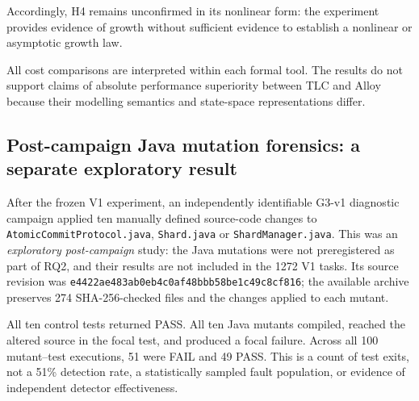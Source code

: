 Accordingly, H4 remains unconfirmed in its nonlinear form: the
experiment provides evidence of growth without sufficient evidence to
establish a nonlinear or asymptotic growth law.

All cost comparisons are interpreted within each formal tool. The
results do not support claims of absolute performance superiority
between TLC and Alloy because their modelling semantics and
state-space representations differ.

\subsection{Post-campaign Java mutation forensics: a separate exploratory result}
\label{subsec:java-g3-forensics}

After the frozen V1 experiment, an independently identifiable G3-v1 diagnostic
campaign applied ten manually defined source-code changes to
\texttt{AtomicCommitProtocol.java}, \texttt{Shard.java} or
\texttt{ShardManager.java}. This was an \emph{exploratory post-campaign}
study: the Java mutations were not preregistered as part of RQ2, and their
results are not included in the 1272 V1 tasks. Its source revision was
\texttt{e4422ae4\allowbreak{}83ab0eb4\allowbreak{}c0af48bb\allowbreak{}b58be1c4\allowbreak{}9c8cf816}; the available
archive preserves 274 SHA-256-checked files and the changes applied to each
mutant.

All ten control tests returned PASS. All ten Java mutants compiled, reached
the altered source in the focal test, and produced a focal failure. Across
all 100 mutant--test executions, 51 were FAIL and 49 PASS. This is a count
of test exits, not a 51\% detection rate, a statistically sampled fault
population, or evidence of independent detector effectiveness.

